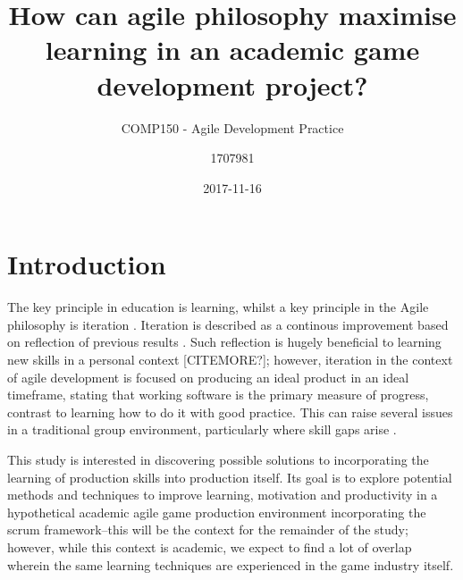 \documentclass{scrartcl}
\title{How can agile philosophy maximise learning in an academic game development project?}
\subtitle{COMP150 - Agile Development Practice}
\date{2017-11-16}
\author{1707981}
\begin{document}
\maketitle
{}


\section{Introduction}
The key principle in education is learning, whilst a key principle in the Agile philosophy is iteration \cite{agile}. Iteration is described as a continous improvement based on reflection of previous results \cite{iteration}. Such reflection is hugely beneficial to learning new skills in a personal context \cite{learnreflection} [CITEMORE?]; however, iteration in the context of agile development is focused on producing an ideal product in an ideal timeframe, stating that working software is the primary measure of progress, \cite{manifesto} contrast to learning how to do it with good practice.  This can raise several issues in a traditional group environment, particularly where skill gaps arise \cite{group2005}.

This study is interested in discovering possible solutions to incorporating the learning of production skills into production itself. Its goal is to explore potential methods and techniques to improve learning, motivation and productivity in a hypothetical academic agile game production environment incorporating the scrum framework--this will be the context for the remainder of the study; however, while this context is academic, we expect to find a lot of overlap wherein the same learning techniques are experienced in the game industry itself.
\end{document}

